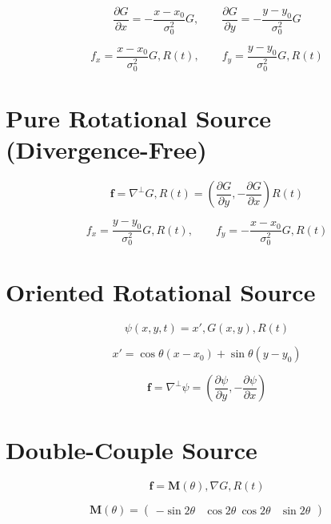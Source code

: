 \documentclass[11pt]{article}
\begin{document}
\begin{equation}
\frac{\partial G}{\partial x} = -\frac{x-x_0}{\sigma_0^2} G,
\qquad
\frac{\partial G}{\partial y} = -\frac{y-y_0}{\sigma_0^2} G
\end{equation}

\begin{equation}
f_x = \frac{x-x_0}{\sigma_0^2} G , R(t),
\qquad
f_y = \frac{y-y_0}{\sigma_0^2} G , R(t)
\end{equation}

\section{Pure Rotational Source (Divergence-Free)}

\begin{equation}
\bm{f} = \nabla^\perp G , R(t)
= \left(\frac{\partial G}{\partial y}, -\frac{\partial G}{\partial x}\right) R(t)
\end{equation}

\begin{equation}
f_x = \frac{y-y_0}{\sigma_0^2} G , R(t),
\qquad
f_y = -\frac{x-x_0}{\sigma_0^2} G , R(t)
\end{equation}

\section{Oriented Rotational Source}

\begin{equation}
\psi(x,y,t) = x' , G(x,y) , R(t)
\end{equation}

\begin{equation}
x' = \cos\theta (x-x_0) + \sin\theta (y-y_0)
\end{equation}

\begin{equation}
\bm{f} = \nabla^\perp \psi
= \left(\frac{\partial \psi}{\partial y}, -\frac{\partial \psi}{\partial x}\right)
\end{equation}

\section{Double-Couple Source}

\begin{equation}
\bm{f} = \bm{M}(\theta),\nabla G , R(t)
\end{equation}

\begin{equation}
\bm{M}(\theta) = \begin{pmatrix}
-\sin 2\theta & \cos 2\theta \
\cos 2\theta & \sin 2\theta
\end{pmatrix}
\end{equation}
\end{document}
